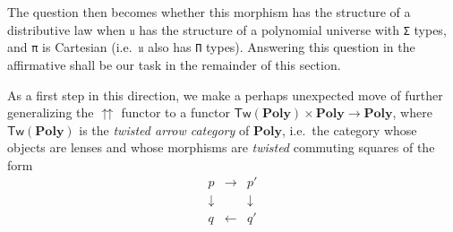 \documentclass[
  11pt,
  oneside,
  article]{memoir}
\theoremstyle{definition}
\theoremstyle{plain}
\newcommand{\0}{\textsf{0}}
\newcommand{\1}{\tn{\textsf{1}}}
\begin{document}
The question then becomes whether this morphism has the structure of a
distributive law when \texttt{𝔲} has the structure of a polynomial
universe with \texttt{Σ} types, and \texttt{π} is Cartesian
(i.e.~\texttt{𝔲} also has \texttt{Π} types). Answering this question in
the affirmative shall be our task in the remainder of this section.

As a first step in this direction, we make a perhaps unexpected move of
further generalizing the \(\upuparrows\) functor to a functor
\(\mathsf{Tw}(\mathbf{Poly}) \times \mathbf{Poly} \to \mathbf{Poly}\),
where \(\mathsf{Tw}(\mathbf{Poly})\) is the \emph{twisted arrow
category} of \(\mathbf{Poly}\), i.e.~the category whose objects are
lenses and whose morphisms are \emph{twisted} commuting squares of the
form \[
\begin{array}{ccc}
p & \to & p'\\
\downarrow & & \downarrow\\
q & \leftarrow & q'
\end{array}
\]
\end{document}
